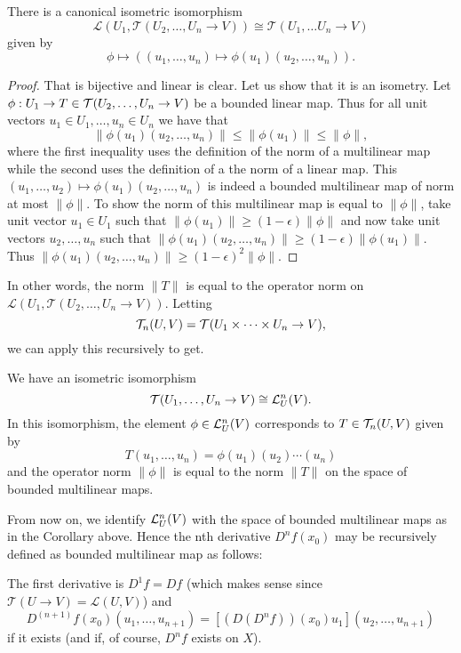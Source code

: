 \documentclass[twoside, a4paper, 10pt]{amsart}
\begin{document}
\begin{prop} There is a canonical isometric isomorphism $$ \mathcal{L}(U_1, \mathcal{T}(U_2, \ldots, U_n \to V)) \cong \mathcal{T}(U_1, \ldots U_n \to V)$$ given by $$\phi \mapsto ((u_1, \ldots, u_n) \mapsto \phi(u_1)(u_2, \ldots, u_n)).$$  \end{prop}

\begin{proof} That is bijective and linear is clear. Let us show that it is an isometry. Let $\phi:U_1 \to T \in \mathcal{T}(U_2, \ldots, U_n \to V)$ be a bounded linear map. Thus for all unit vectors $u_1 \in U_1, \ldots, u_n \in U_n$ we have that $$\|\phi(u_1)(u_2, \ldots, u_n) \| \leq \|\phi(u_1)\| \leq \|\phi\|,$$ where the first inequality uses the definition of the norm of a multilinear map while the second uses the definition of a the norm of a linear map. This $(u_1, \ldots, u_2) \mapsto \phi(u_1)(u_2, \ldots, u_n)$ is indeed a bounded multilinear map of norm at most $\|\phi \|$. To show the norm of this multilinear map is equal to $\|\phi\|$, take unit vector $u_1 \in U_1$ such that $\|\phi(u_1) \| \geq (1-\epsilon) \|\phi\|$ and now take unit vectors $u_2, \ldots, u_n$ such that $\|\phi(u_1)(u_2, \ldots, u_n)\| \geq (1-\epsilon) \|\phi(u_1)\|$. Thus $\| \phi(u_1)(u_2, \ldots, u_n) \| \geq (1-\epsilon)^2 \|\phi\|$.

\end{proof}

In other words, the norm $\| T \|$ is equal to the operator norm on $\mathcal{L}(U_1, \mathcal{T}(U_2, \ldots, U_n \to V)).$ Letting $$\mathcal{T}_n(U,V) = \mathcal{T}(U_1 \times \cdots \times U_n \to V),$$we can apply this recursively to get.

\begin{corol} We have an isometric isomorphism $$\mathcal{T}(U_1, \ldots, U_n \to V) \cong \mathcal{L}^n_U(V).$$ 
In this isomorphism, the element $\phi \in \mathcal{L}^n_U(V)$ corresponds to $T \in \mathcal{T}_n(U,V)$ given by $$T(u_1, \ldots, u_n) = \phi(u_1)(u_2) \cdots(u_n)$$ and the operator norm $\|\phi\|$ is equal to the norm $\|T\|$ on the space of bounded multilinear maps.

\end{corol}

From now on, we identify $\mathcal{L}^n_U(V)$ with the space of bounded multilinear maps as in the Corollary above. 
Hence the nth derivative $D^nf(x_0)$ may be recursively defined as bounded multilinear map as follows:

 The first derivative is $D^1f = Df$ (which makes sense since $\mathcal{T}(U \to V) = \mathcal{L}(U, V)$) and $$D^{(n+1)}f (x_0)(u_1, \ldots, u_{n+1}) = [(D(D^nf))(x_0)u_1] (u_2, \ldots, u_{n+1})$$ if it exists (and if, of course, $D^nf$ exists on $X$). 
\end{document}
